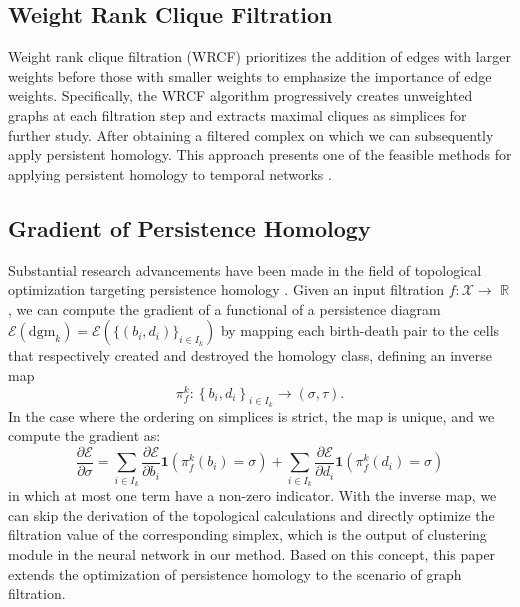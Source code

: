 \documentclass[letterpaper]{article} %
\begin{document}
\subsection{Weight Rank Clique Filtration}
Weight rank clique filtration (WRCF) \cite{petri2013topological} prioritizes the addition of edges with larger weights before those with smaller weights to emphasize the importance of edge weights. Specifically, the WRCF algorithm progressively creates unweighted graphs at each filtration step and extracts maximal cliques as simplices for further study. After obtaining a filtered complex on which we can subsequently apply persistent homology. This approach presents one of the feasible methods for applying persistent homology to temporal networks \cite{lozeve2018topological}.

\subsection{Gradient of Persistence Homology}
Substantial research advancements have been made in the field of topological optimization targeting persistence homology \cite{brüelgabrielsson2020topology,vandaele2022topologically}. Given an input filtration $f: \mathcal{X} \rightarrow$ $\mathbb{R}$, we can compute the gradient of a functional of a persistence diagram $\mathcal{E}\left(\mathrm{dgm}_k\right) =\mathcal{E}\left(\{ (b_i, d_i) \}_{i \in I_k}\right)
$ by mapping each birth-death pair to the cells that respectively created and destroyed the homology class, defining an inverse map
\begin{equation}
\label{eq:inv map}
\pi^k_f:\left\{b_i, d_i\right\}_{i \in I_k} \rightarrow(\sigma, \tau) .
\end{equation}
In the case where the ordering on simplices is strict, the map is unique, and we compute the gradient as:
\begin{equation}
\frac{\partial \mathcal{E}}{\partial \sigma}=\sum_{i \in I_k} \frac{\partial \mathcal{E}}{\partial b_i} \mathbf{1}(\pi^k_f\left(b_i\right)=\sigma)+\sum_{i \in I_k} \frac{\partial \mathcal{E}}{\partial d_i} \mathbf{1}(\pi^k_f\left(d_i\right)=\sigma)
\end{equation}
in which at most one term have a non-zero indicator. With the inverse map, we can skip the derivation of the topological calculations and directly optimize the filtration value of the corresponding simplex, which is the output of clustering module in the neural network in our method. Based on this concept, this paper extends the optimization of persistence homology to the scenario of graph filtration.




\end{document}
